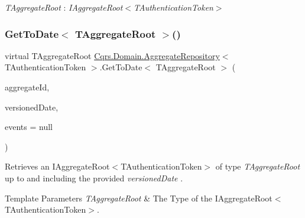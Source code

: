 \begin{Desc}
\item[Type Constraints]\begin{description}
\item[{\em T\+Aggregate\+Root} : {\em I\+Aggregate\+Root$<$T\+Authentication\+Token$>$}]\end{description}
\end{Desc}
\mbox{\label{classCqrs_1_1Domain_1_1AggregateRepository_aaf2dba9114b4626ef1abb10879e38bed_aaf2dba9114b4626ef1abb10879e38bed}} 
\subsubsection{\texorpdfstring{Get\+To\+Date$<$ T\+Aggregate\+Root $>$()}{GetToDate< TAggregateRoot >()}}
{\footnotesize\ttfamily virtual T\+Aggregate\+Root \hyperlink{classCqrs_1_1Domain_1_1AggregateRepository}{Cqrs.\+Domain.\+Aggregate\+Repository}$<$ T\+Authentication\+Token $>$.Get\+To\+Date$<$ T\+Aggregate\+Root $>$ (\begin{DoxyParamCaption}\item[{Guid}]{aggregate\+Id,  }\item[{Date\+Time}]{versioned\+Date,  }\item[{I\+List$<$ \hyperlink{interfaceCqrs_1_1Events_1_1IEvent}{I\+Event}$<$ T\+Authentication\+Token $>$$>$}]{events = {\ttfamily null} }\end{DoxyParamCaption})\hspace{0.3cm}{\ttfamily [virtual]}}



Retrieves an I\+Aggregate\+Root$<$\+T\+Authentication\+Token$>$ of type {\itshape T\+Aggregate\+Root}  up to and including the provided {\itshape versioned\+Date} . 


\begin{DoxyTemplParams}{Template Parameters}
{\em T\+Aggregate\+Root} & The Type of the I\+Aggregate\+Root$<$\+T\+Authentication\+Token$>$.\\
\hline
\end{DoxyTemplParams}

